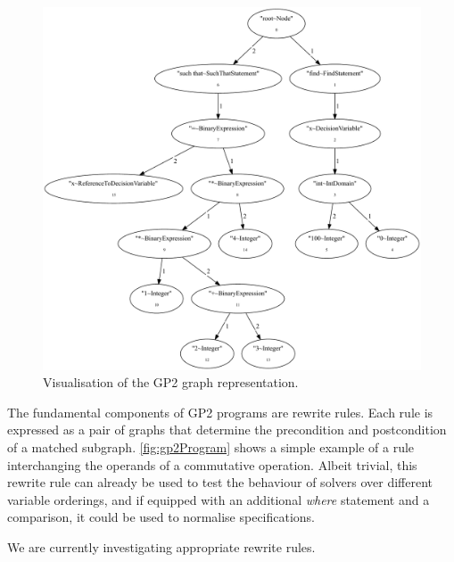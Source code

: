 \documentclass[a4paper,UKenglish,cleveref, autoref,pdfa]{lipics-v2021}
\begin{document}
\begin{figure}
    \includegraphics[width=\linewidth]{gp2graph.pdf}
  \caption{Visualisation of the GP2 graph representation.}
  \label{fig:gp2graph}
\end{figure}

The fundamental components of GP2 programs are rewrite rules.
Each rule is expressed as a pair of graphs that determine the precondition and postcondition of a matched subgraph.
\cref{fig:gp2Program} shows a simple example of a rule interchanging the operands of a commutative operation. Albeit trivial, this rewrite rule can already be used to test the behaviour of solvers over different variable orderings, and if equipped with an additional \textit{where} statement and a comparison, it could be used to normalise specifications.

We are currently investigating appropriate rewrite rules.
\end{document}
